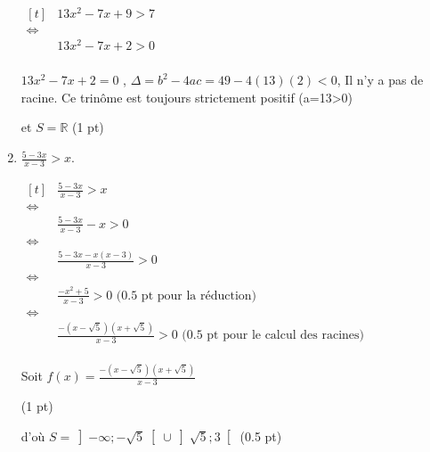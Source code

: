 \documentclass[a4paper,11pt]{article}
\theoremstyle{break}
\begin{document}
\begin{exo}
\begin{enumerate}
\begin{correction}

$\begin{aligned}[t]
           & 13 x^2-7 x+9>7 \\
      \iff \\
           & 13 x^2-7 x+2>0\\
 \end{aligned}$          
 
 $13 x^2-7 x+2=0$ , $\Delta=b^2-4ac=49-4(13)(2)<0$, Il n'y a pas de racine.
 Ce trin\^ome est toujours strictement positif (a=13>0)
    
 et   $S=\mathbb{R}$ (1 pt)
    
 
\end{correction}   

  \item $\frac{5-3 x}{x-3}>x$.

\begin{correction}

$\begin{aligned}[t]
           & \frac{5-3x}{x-3}>x\\
      \iff \\
           & \frac{5-3x}{x-3}-x>0\\
      \iff \\
           & \frac{5-3x-x(x-3)}{x-3}>0\\
      \iff \\
           &\frac{-x^2+5}{x-3}>0 \textrm{ (0.5 pt pour la r\'eduction) }\\     
      \iff \\
           &\frac{-(x-\sqrt{5})(x+\sqrt{5})}{x-3}>0 \textrm{ (0.5 pt pour le calcul des racines) }\\    
\end{aligned}$
 
 Soit $f(x)=\frac{-(x-\sqrt{5})(x+\sqrt{5})}{x-3}$

 (1 pt) 
 
 d'o\`u $S=\left ]-\infty;-\sqrt{5}\right [ \cup \left ]\sqrt{5};3 \right [$ (0.5 pt)
\end{correction}   
   
    
    
    
    \end{enumerate}
  \end{exo}
\end{document}
